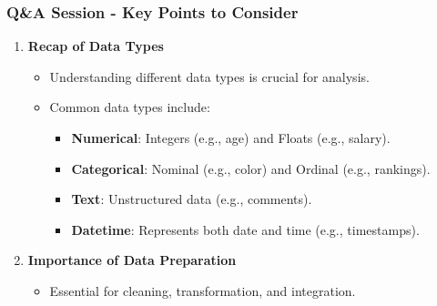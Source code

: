 \documentclass{beamer}
\begin{document}
\begin{frame}[fragile]
    \frametitle{Q\&A Session - Key Points to Consider}
    \begin{enumerate}
        \item \textbf{Recap of Data Types}
        \begin{itemize}
            \item Understanding different data types is crucial for analysis.
            \item Common data types include:
            \begin{itemize}
                \item \textbf{Numerical}: Integers (e.g., age) and Floats (e.g., salary).
                \item \textbf{Categorical}: Nominal (e.g., color) and Ordinal (e.g., rankings).
                \item \textbf{Text}: Unstructured data (e.g., comments).
                \item \textbf{Datetime}: Represents both date and time (e.g., timestamps).
            \end{itemize}
        \end{itemize}

        \item \textbf{Importance of Data Preparation}
        \begin{itemize}
            \item Essential for cleaning, transformation, and integration.
        \end{itemize}
    \end{enumerate}
\end{frame}
\end{document}
